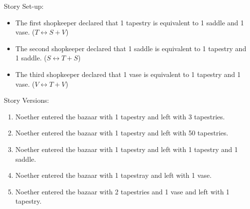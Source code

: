 Story Set-up:
\begin{itemize}
\item The first shopkeeper declared that 1 tapestry is equivalent to 1 saddle and 1 vase. (\(T \leftrightarrow S + V\))
\item The second shopkeeper declared that 1 saddle is equivalent to 1 tapestry and 1 saddle. (\(S \leftrightarrow T + S\))
\item The third shopkeeper declared that 1 vase is equivalent to 1 tapestry and 1 vase. (\(V \leftrightarrow T + V\))
\end{itemize}

Story Versions:
\begin{enumerate}
\item Noether entered the bazaar with 1 tapestry and left with 3 tapestries.
\item Noether entered the bazaar with 1 tapestry and left with 50 tapestries.
\item Noether entered the bazaar with 1 tapestry and left with 1 tapestry and 1 saddle.
\item Noether entered the bazaar with 1 tapestray and left with 1 vase.
\item Noether entered the bazaar with 2 tapestries and 1 vase and left with 1 tapestry.
\end{enumerate}

